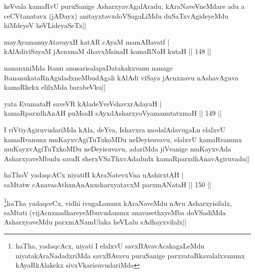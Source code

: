 \begin{artha}
keVvala kamaRvU puruSanige AsharxyavAgalAradu, kAraNaveVneMdare adu a ceCVtanatavx (jADayx) anitayxtavxdoVSagaLiMdu duSaTxvAgideyeMdu hiMdeyeV heVLideyaSeTx||
\end{artha}

\begin{shl}
mayA\s yamanuyAtavayxH katAR cAyaM mamABavatf |\\
kAlAdiviSayaM jAcnxnaM dhavxMsinaH kamaRNaH kutaH \hfill || 148 ||
\end{shl}

\begin{artha}
nananxniMda Itanu anusarisalapxDatakakxvanu nanage ItananukataRnAgidadxneMbudAgali kAlAdi viSaya jAcnxnavu nAshavAguva kamaRkekx elilxMda barabeVku||
\end{artha}


\begin{shl}
yata EvamataH saveVR kAladeYveVshavxrAdayaH |\\
kamaRparxdhAnAH puMsaH sAyxdAsharxyoV\s yamanutatxmaH \hfill || 149 ||
\end{shl}

\begin{artha}
I riVtiyAgiruvudariMda kAla, deYva, Ishavxra modalAdavugaLu elalxvU kamaRvanunx muKayxvAgiTuTxkoMDu neDeyisuvavu, elalxvU kamaRvanunx muKayxvAgiTuTxkoMDu neDeyisuvavu, adariMda jiVvanige muKayxvAda AsharxyaveMbudu savaR sherxVSaThxvAdadudx kamaRparxdhAnavAgiruvadu||
\end{artha}

\begin{shl}
haThoV yadaqcACx niyatiH kAraNatevxVna nA\s \s shirxtAH |\\
saMtatw cAnavasAthxnAnAnx\s \s sharxyatavxM parxmANataH \hfill || 150 ||
\end{shl}

\begin{artha}
\footnote{haTha, yadaqcAcx, niyati I elalxvU savxBAvavAcakagaLeMdu niyatakAraNadadxriMda savxBAvavu puruSanige parxvataRkavalalxvanunx kAyaRkAlakekx sivxVkarisuvudariMda}haTha yadaqceCx, vidhi ivugaLanunx kAraNaveMdu nAvu Asharxyisilalx, saMtati (vijAcnxnadhareyeMbuvudanunx anavasethxyeMba doVSadiMda AsharxyaveMdu parxmANamUlaka heVLalu sAdhayxvilalx||
\end{artha}


